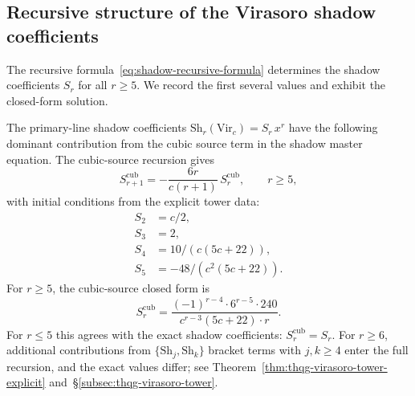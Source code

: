 
\subsection{Recursive structure of the Virasoro
shadow coefficients}
\label{subsec:virasoro-shadow-recursive}

The recursive formula~\eqref{eq:shadow-recursive-formula}
determines the shadow coefficients $S_r$ for all
$r \geq 5$. We record the first several values and
exhibit the closed-form solution.

\begin{proposition}
\label{prop:virasoro-shadow-coefficients}
The primary-line shadow coefficients
$\mathrm{Sh}_r(\mathrm{Vir}_c) = S_r\,x^r$
have the following dominant contribution from
the cubic source term in the shadow master equation.
The cubic-source recursion gives
\begin{equation}\label{eq:virasoro-shadow-recursion}
S_{r+1}^{\mathrm{cub}} = -\frac{6r}{c(r+1)}\,S_r^{\mathrm{cub}},
\qquad r \geq 5,
\end{equation}
with initial conditions from the explicit tower data:
\begin{align}
S_2 &= c/2, \label{eq:s2} \\
S_3 &= 2, \label{eq:s3} \\
S_4 &= 10/(c(5c+22)), \label{eq:s4} \\
S_5 &= -48/(c^2(5c+22)). \label{eq:s5}
\end{align}
For $r \geq 5$, the cubic-source closed form is
\begin{equation}\label{eq:virasoro-shadow-closed-form}
S_r^{\mathrm{cub}} =
\frac{(-1)^{r-4} \cdot 6^{r-5} \cdot 240}
{c^{r-3}(5c+22) \cdot r}.
\end{equation}
For $r \leq 5$ this agrees with the exact shadow
coefficients: $S_r^{\mathrm{cub}} = S_r$.
For $r \geq 6$, additional contributions from
$\{\mathrm{Sh}_j, \mathrm{Sh}_k\}$ bracket terms with
$j,k \geq 4$ enter the full recursion, and the exact
values differ; see
Theorem~\textup{\ref{thm:thqg-virasoro-tower-explicit}}
and~\S\textup{\ref{subsec:thqg-virasoro-tower}}.
\end{proposition}

